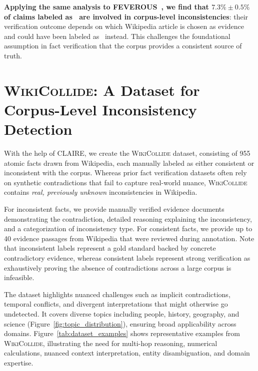 \documentclass[11pt]{article}
\newcommand{\dataset}[0]{\textsc{WikiCollide}\xspace}
\newcommand{\system}[0]{\textsc{CLAIRE}\xspace}
\newcommand{\feverous}[0]{\textsc{FEVEROUS}\xspace}
\newcommand{\supports}{%
\tcbox[colback=green!10,colframe=green!50!black,boxrule=0.3pt,arc=2pt,
top=-3.5pt,bottom=-3.5pt,left=0.5pt,right=0.5pt,
nobeforeafter,tcbox raise base]{\texttt{\strut Supports}}%
}
\newcommand{\refutes}{%
\tcbox[colback=red!10,colframe=red!50!black,boxrule=0.3pt,arc=2pt,
top=-3.5pt,bottom=-3.5pt,left=0.5pt,right=0.5pt,
nobeforeafter,tcbox raise base]{\texttt{\strut Refutes}}%
}
\begin{document}
\textbf{Applying the same analysis to \feverous~\cite{aly-etal-2021-fact}, we find that $7.3\% \pm 0.5\%$ of claims labeled as \supports~are involved in corpus-level inconsistencies}: their verification outcome depends on which Wikipedia article is chosen as evidence and could have been labeled as \refutes~instead. This challenges the foundational assumption in fact verification that the corpus provides a consistent source of truth. 



\section{\dataset: A Dataset for Corpus-Level Inconsistency Detection}
\label{sec:dataset}

With the help of \system, we create the \dataset dataset, consisting of 955 atomic facts drawn from Wikipedia, each manually labeled as either consistent or inconsistent with the corpus. Whereas prior fact verification datasets often rely on synthetic contradictions that fail to capture real-world nuance, \dataset contains \emph{real, previously unknown} inconsistencies in Wikipedia.

For inconsistent facts, we provide manually verified evidence documents demonstrating the contradiction, detailed reasoning explaining the inconsistency, and a categorization of inconsistency type. For consistent facts, we provide up to 40 evidence passages from Wikipedia that were reviewed during annotation. Note that inconsistent labels represent a gold standard backed by concrete contradictory evidence, whereas consistent labels represent strong verification as exhaustively proving the absence of contradictions across a large corpus is infeasible.

The dataset highlights nuanced challenges such as implicit contradictions, temporal conflicts, and divergent interpretations that might otherwise go undetected. It covers diverse topics including people, history, geography, and science (Figure~\ref{fig:topic_distribution}), ensuring broad applicability across domains. Figure~\ref{tab:dataset_examples} shows representative examples from \dataset, illustrating the need for multi-hop reasoning, numerical calculations, nuanced context interpretation, entity disambiguation, and domain expertise.
\end{document}
